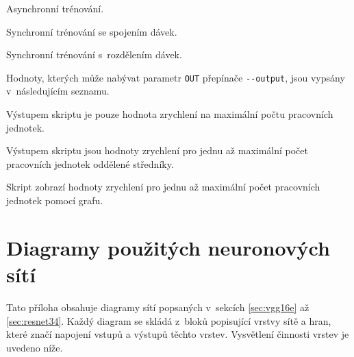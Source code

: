 \begin{description}[font=\ttfamily\bfseries]
    \item[async]
    Asynchronní trénování.
    \item[sync-join]
    Synchronní trénování se spojením dávek.
    \item[sync-split]
    Synchronní trénování s~rozdělením dávek.
\end{description}

Hodnoty, kterých může nabývat parametr {\tt OUT} přepínače {\tt -{}-output}, jsou vypsány v~následujícím seznamu.

\begin{description}[font=\ttfamily\bfseries]
    \item[single]
    Výstupem skriptu je pouze hodnota zrychlení na maximální počtu pracovních jednotek.
    \item[csv]
    Výstupem skriptu jsou hodnoty zrychlení pro jednu až maximální počet pracovních jednotek oddělené středníky.
    \item[plot]
    Skript zobrazí hodnoty zrychlení pro jednu až maximální počet pracovních jednotek pomocí grafu.
\end{description}

\chapter{Diagramy použitých neuronových sítí}
\label{chap:nn_diags}

Tato příloha obsahuje diagramy sítí popsaných v~sekcích \ref{sec:vgg16e} až \ref{sec:resnet34}.
Každý diagram se skládá z~bloků popisující vrstvy sítě a hran, které značí napojení vstupů a výstupů těchto vrstev.
Vysvětlení činnosti vrstev je uvedeno níže.

